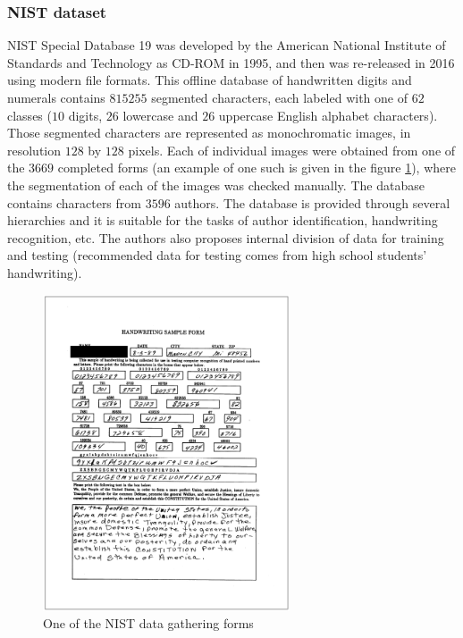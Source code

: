 \documentclass[eng]{simposium}
\begin{document}
\subsubsection{NIST dataset}

NIST Special Database 19 \cite{12}\cite{13} was developed by the American National Institute of Standards and Technology as CD-ROM in 1995, and then was 
re-released in 2016 using modern file formats. 
This offline database of handwritten digits and numerals contains $815255$ segmented characters, each labeled 
with one of $62$ classes ($10$ digits, $26$ lowercase and $26$ uppercase English alphabet characters). 
Those segmented characters are represented as monochromatic images, in resolution $128$ by $128$ pixels. 
Each of individual images were obtained from one of the $3669$ completed forms (an example of one such is given in the figure \ref{fig:nist}), 
where the segmentation of each of the images was checked manually. 
The database contains characters from $3596$ authors. 
The database is provided through several hierarchies and it is suitable for the tasks of author identification, handwriting recognition, etc. 
The authors also proposes internal division of data for training and testing 
(recommended data for testing comes from high school students' handwriting). 

\begin{figure}[!ht]
  \centering
  \includegraphics[width=0.65\textwidth]{nist.png}
  \caption{One of the NIST data gathering forms \cite{9}}
  \label{fig:nist}
\end{figure}
\end{document}

